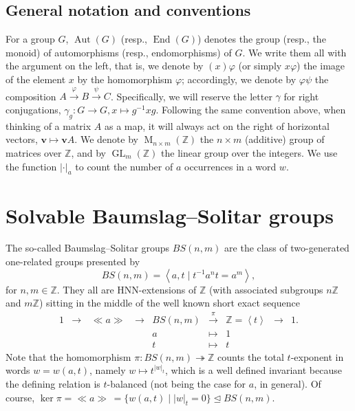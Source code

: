 \documentclass[english]{amsart}
\newtheorem*{thm*}{Theorem}
\theoremstyle{definition}
\newcommand\ZZ{\mathbb{Z}}
\newcommand{\Mat}{\operatorname{M}}
\newcommand{\GL}{\operatorname{GL}}
\newcommand{\Aut}{\operatorname{Aut}}
\newcommand{\End}{\operatorname{End}}
\newcommand{\gen}[1]{\left\langle#1\right\rangle}
\newcommand{\pres}[2]{\left\langle#1 \mid #2\right\rangle}
\newcommand{\ncl}[1]{\ll \!#1 \!\gg}
\begin{document}


\subsection*{General notation and conventions}

For a group $G$, $\Aut(G)$ (resp., $\End(G)$) denotes the group (resp., the monoid) of automorphisms (resp., endomorphisms) of $G$. We write them all with the argument on the left, that is, we denote by $(x)\varphi$ (or simply $x\varphi$) the image of the element $x$ by the homomorphism $\varphi$; accordingly, we denote by $\varphi \psi$ the composition $A \xrightarrow{\varphi} B \xrightarrow{\psi} C$. Specifically, we will reserve the letter $\gamma$ for right conjugations, $\gamma_g \colon G \to G, x\mapsto g^{-1}xg$. Following the same convention above, when thinking of a matrix $A$ as a map, it will always act on the right of horizontal vectors, $\textbf{v}\mapsto \textbf{v}A$. We denote by $\Mat_{n\times m}(\ZZ)$ the $n \times m$ (additive) group of matrices over $\ZZ$, and by $\GL_m(\ZZ)$ the linear group over the integers. We use the function $| \cdot |_a$ to count the number of $a$ occurrences in a word $w$.

\section{Solvable Baumslag--Solitar groups}\label{sec: BS overview}

The so-called Baumslag--Solitar groups $BS(n,m)$ are the class of two-generated one-related groups presented by 
 $$
BS(n,m) = \pres{a,t}{t^{-1}a^n t=a^m},
 $$
for $n, m\in \ZZ$. They all are HNN-extensions of $\ZZ$ (with associated subgroups $n\ZZ$ and $m\ZZ$) sitting in the middle of the well known short exact sequence
 \begin{equation}\label{ses}
\begin{array}{ccccccccc} 1 & \to\, & \ncl{a} & \, \to & BS(n,m) & \stackrel{\pi}{\to} & \ZZ =\gen{t} & \to & 1. \\ & & & & a & \mapsto & 1 & & \\ & & & & t & \mapsto & t & &
\end{array}
 \end{equation}
Note that the homomorphism $\pi\colon BS(n,m)\twoheadrightarrow \ZZ$ counts the total $t$-exponent in words $w=w(a,t)$, namely $w\mapsto t^{|w|_t}$, which is a well defined invariant because the defining relation is $t$-balanced (not being the case for $a$, in general). Of course, $\ker \pi =\ncl{a}\, =\{w(a,t) \mid |w|_t =0\}\unlhd BS(n,m)$.
\end{document}
